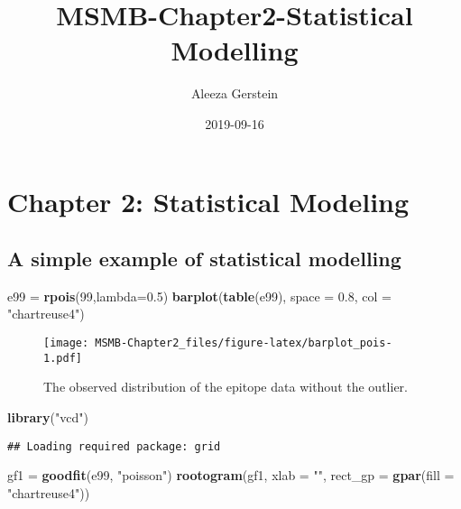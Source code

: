 \documentclass[]{article}
\title{MSMB-Chapter2-Statistical Modelling}
\author{Aleeza Gerstein}
\date{2019-09-16}
\newenvironment{Shaded}{\begin{snugshade}}{\end{snugshade}}
\newcommand{\KeywordTok}[1]{\textcolor[rgb]{0.13,0.29,0.53}{\textbf{#1}}}
\newcommand{\DataTypeTok}[1]{\textcolor[rgb]{0.13,0.29,0.53}{#1}}
\newcommand{\DecValTok}[1]{\textcolor[rgb]{0.00,0.00,0.81}{#1}}
\newcommand{\FloatTok}[1]{\textcolor[rgb]{0.00,0.00,0.81}{#1}}
\newcommand{\StringTok}[1]{\textcolor[rgb]{0.31,0.60,0.02}{#1}}
\newcommand{\NormalTok}[1]{#1}
\begin{document}
\maketitle

\section{Chapter 2: Statistical
Modeling}\label{chapter-2-statistical-modeling}

\subsection{A simple example of statistical
modelling}\label{a-simple-example-of-statistical-modelling}

\begin{Shaded}
\begin{Highlighting}[]
\NormalTok{e99 =}\StringTok{ }\KeywordTok{rpois}\NormalTok{(}\DecValTok{99}\NormalTok{,}\DataTypeTok{lambda=}\FloatTok{0.5}\NormalTok{)}
\KeywordTok{barplot}\NormalTok{(}\KeywordTok{table}\NormalTok{(e99), }\DataTypeTok{space =} \FloatTok{0.8}\NormalTok{, }\DataTypeTok{col =} \StringTok{"chartreuse4"}\NormalTok{)}
\end{Highlighting}
\end{Shaded}

\begin{figure}
\centering
\texttt{[image: MSMB-Chapter2\_files/figure-latex/barplot\_pois-1.pdf]}
\caption{The observed distribution of the epitope data without the
outlier.}
\end{figure}

\begin{Shaded}
\begin{Highlighting}[]
\KeywordTok{library}\NormalTok{(}\StringTok{"vcd"}\NormalTok{)}
\end{Highlighting}
\end{Shaded}

\begin{verbatim}
## Loading required package: grid
\end{verbatim}

\begin{Shaded}
\begin{Highlighting}[]
\NormalTok{gf1 =}\StringTok{ }\KeywordTok{goodfit}\NormalTok{(e99, }\StringTok{"poisson"}\NormalTok{)}
\KeywordTok{rootogram}\NormalTok{(gf1, }\DataTypeTok{xlab =} \StringTok{""}\NormalTok{, }\DataTypeTok{rect_gp =} \KeywordTok{gpar}\NormalTok{(}\DataTypeTok{fill =} \StringTok{"chartreuse4"}\NormalTok{))}
\end{Highlighting}
\end{Shaded}
\end{document}
